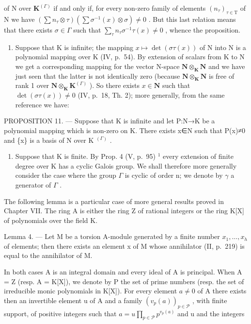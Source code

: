 of N over \(\mathbf{K}^{(\Gamma)}\) if and only if, for every non-zero family of elements \((n_{\tau})_{\tau\in\mathrm{T}}\) of N we have \(\left(\sum n_{\tau}\otimes\tau\right)\left(\sum\sigma^{-1}(x)\otimes\sigma\right)\neq0\) . But this last relation means that there exists \(\sigma\in\Gamma\) such that \(\sum_{\tau}n_{\tau}\sigma^{-1}\tau(x)\neq0\) , whence the proposition.

\begin{enumerate}
\def\labelenumi{\Alph{enumi})}
\tightlist
\item
  Suppose that K is infinite; the mapping \(x \mapsto \det(\sigma\tau(x))\) of N into N is a polynomial mapping over K (IV, p.~54). By extension of scalars from K to N we get a corresponding mapping for the vector N-space \(\mathbf{N} \otimes_{\mathbf{K}} \mathbf{N}\) and we have just seen that the latter is not identically zero (because \(\mathbf{N} \otimes_{\mathbf{K}} \mathbf{N}\) is free of rank 1 over \(\mathbf{N} \otimes_{\mathbf{K}} \mathbf{K}^{(\Gamma)}\) ). So there exists \(x \in \mathbf{N}\) such that \(\det(\sigma\tau(x)) \neq 0\) (IV, p.~18, Th. 2); more generally, from the same reference we have:
\end{enumerate}

PROPOSITION 11. --- Suppose that K is infinite and let P:N→K be a polynomial mapping which is non-zero on K. There exists x∈N such that P(x)≠0 and \{x\} is a basis of N over K \(^{(\Gamma)}\) .

\begin{enumerate}
\def\labelenumi{\Alph{enumi})}
\setcounter{enumi}{1}
\tightlist
\item
  Suppose that K is finite. By Prop. 4 (V, p.~95) \(^{1}\) every extension of finite degree over K has a cyclic Galois group. We shall therefore more generally consider the case where the group \(\Gamma\) is cyclic of order n; we denote by \(\gamma\) a generator of \(\Gamma\) .
\end{enumerate}

The following lemma is a particular case of more general results proved in Chapter VII. The ring A is either the ring Z of rational integers or the ring K{[}X{]} of polynomials over the field K.

Lemma 4. --- Let M be a torsion A-module generated by a finite number \(x_{1}, \ldots, x_{h}\) of elements; then there exists an element x of M whose annihilator (II, p.~219) is equal to the annihilator of M.

In both cases A is an integral domain and every ideal of A is principal. When A = Z (resp. A = K{[}X{]}), we denote by P the set of prime numbers (resp. the set of irreducible monic polynomials in K{[}X{]}). For every element \(a \neq 0\) of A there exists then an invertible element u of A and a family \((v_{p}(a))_{p \in \mathcal{P}}\) , with finite support, of positive integers such that \(a = u \prod_{p \in \mathcal{P}} p^{v_{p}(a)}\) and u and the integers

